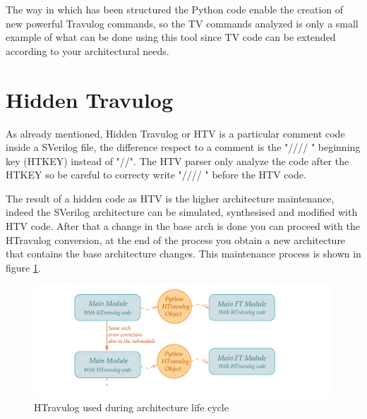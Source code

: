 {{{        }
    
    The way in which has been structured the Python code enable the creation of new powerful Travulog commands, so the TV commands analyzed is only a small example of what can be done using this tool since TV code can be extended according to your architectural needs. 
	}%


	\section{Hidden Travulog}{
        As already mentioned, Hidden Travulog or HTV is a particular comment code inside a SVerilog file, the difference respect to a comment is the "//// " beginning key (HTKEY) instead of "//". The HTV parser only analyze the code after the HTKEY so be careful to correcty write "//// " before the HTV code.
        
        The result of a hidden code as HTV is the higher architecture maintenance, indeed the SVerilog architecture can be simulated, synthesised and modified with HTV code. After that a change in the base arch is done you can proceed with the HTravulog conversion, at the end of the process you obtain a new architecture that contains the base architecture changes. This maintenance process is shown in figure \ref{fig:HtravulogCycle}.
		\begin{figure}[H]
			\centering
			\includegraphics[scale=0.2,center]{./images/HTravulogArchMaintenance.png}
			\caption{HTravulog used during architecture life cycle}
			\label{fig:HtravulogCycle}
		\end{figure} 
        
}}

